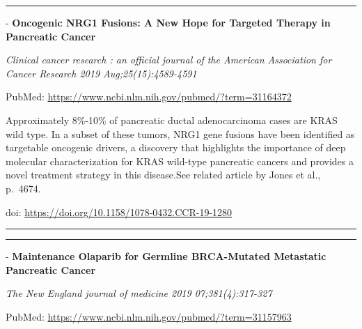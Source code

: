 \documentclass[]{article}
\begin{document}
\begin{center}\rule{0.5\linewidth}{\linethickness}\end{center}

 - \textbf{Oncogenic NRG1 Fusions: A New Hope for Targeted Therapy in
Pancreatic Cancer}

\emph{Clinical cancer research : an official journal of the American
Association for Cancer Research 2019 Aug;25(15):4589-4591}

PubMed: \url{https://www.ncbi.nlm.nih.gov/pubmed/?term=31164372}

Approximately 8\%-10\% of pancreatic ductal adenocarcinoma cases are
KRAS wild type. In a subset of these tumors, NRG1 gene fusions have been
identified as targetable oncogenic drivers, a discovery that highlights
the importance of deep molecular characterization for KRAS wild-type
pancreatic cancers and provides a novel treatment strategy in this
disease.See related article by Jones et al., p.~4674.

doi: \url{https://doi.org/10.1158/1078-0432.CCR-19-1280}

{}

{}

\begin{center}\rule{0.5\linewidth}{\linethickness}\end{center}

\begin{center}\rule{0.5\linewidth}{\linethickness}\end{center}

 - \textbf{Maintenance Olaparib for Germline BRCA-Mutated Metastatic
Pancreatic Cancer}

\emph{The New England journal of medicine 2019 07;381(4):317-327}

PubMed: \url{https://www.ncbi.nlm.nih.gov/pubmed/?term=31157963}
\end{document}
